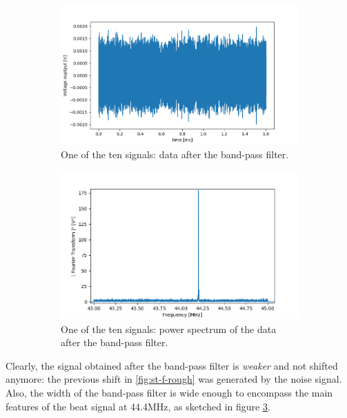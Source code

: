\documentclass[11pt]{report}
\begin{document}
\begin{figure}[h!]
\centering
\begin{subfigure}{.48\textwidth}
  \centering
  \includegraphics[width=1.1\linewidth]{st-f-bpf}
  \caption{One of the ten signals: data after the band-pass filter.}
  \label{fig:st-f-bpf}
\end{subfigure}%
\hspace{1em}%
\begin{subfigure}{.48\textwidth}
  \centering
  \includegraphics[width=1.1\linewidth]{st-fft-bpf}
  \caption{One of the ten signals: power spectrum of the data after the band-pass filter.}
  \label{fig:st-fft-bpf}
\end{subfigure}
\caption{}
\end{figure}

Clearly, the signal obtained after the band-pass filter is \textit{weaker} and not shifted anymore: the previous shift in \ref{fig:st-f-rough} was generated by the noise signal. Also, the width of the band-pass filter is wide enough to encompass the main features of the beat signal at 44.4MHz, as sketched in figure \ref{fig:st-fft-bpf}.
\end{document}
